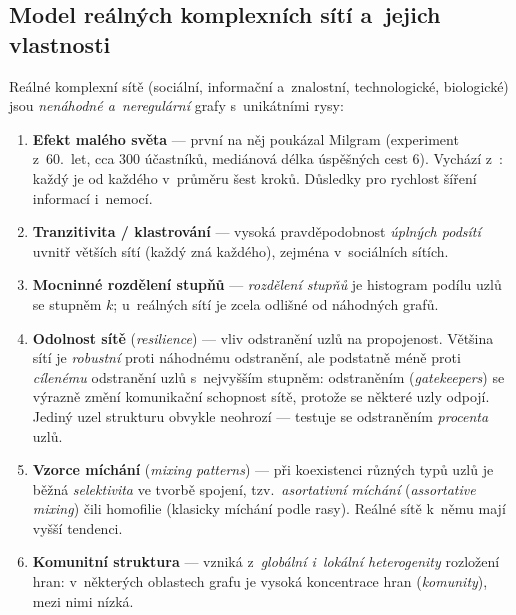 \documentclass[11pt,a4paper]{article}
\theoremstyle{definition}
\begin{document}
\subsection{Model reálných komplexních sítí a~jejich vlastnosti}

\begin{defbox}
Reálné komplexní sítě (sociální, informační a~znalostní, technologické, biologické) jsou
\emph{nenáhodné a~neregulární} grafy s~unikátními rysy:
\begin{enumerate}
\item \textbf{Efekt malého světa} --- první na něj poukázal Milgram (experiment z~60.~let, cca
      300 účastníků, mediánová délka úspěšných cest 6). Vychází z~:
      každý je od každého v~průměru šest kroků. Důsledky pro rychlost šíření informací i~nemocí.
\item \textbf{Tranzitivita / klastrování} --- vysoká pravděpodobnost \emph{úplných podsítí}
      uvnitř větších sítí (každý zná každého), zejména v~sociálních sítích.
\item \textbf{Mocninné rozdělení stupňů} --- \emph{rozdělení stupňů} je histogram podílu uzlů
      se stupněm $k$; u~reálných sítí je zcela odlišné od náhodných grafů.
\item \textbf{Odolnost sítě} (\emph{resilience}) --- vliv odstranění uzlů na propojenost.
      Většina sítí je \emph{robustní} proti náhodnému odstranění, ale podstatně méně proti
      \emph{cílenému} odstranění uzlů s~nejvyšším stupněm: odstraněním 
      (\emph{gatekeepers}) se výrazně změní komunikační schopnost sítě, protože se některé uzly
      odpojí. Jediný uzel strukturu obvykle neohrozí --- testuje se odstraněním \emph{procenta}
      uzlů.
\item \textbf{Vzorce míchání} (\emph{mixing patterns}) --- při koexistenci různých typů uzlů je
      běžná \emph{selektivita} ve tvorbě spojení, tzv.\ \emph{asortativní míchání}
      (\emph{assortative mixing}) čili homofilie (klasicky míchání podle rasy). Reálné sítě
      k~němu mají vyšší tendenci.
\item \textbf{Komunitní struktura} --- vzniká z~\emph{globální i~lokální heterogenity} rozložení
      hran: v~některých oblastech grafu je vysoká koncentrace hran (\emph{komunity}), mezi nimi
      nízká.
\end{enumerate}
\end{defbox}
\end{document}
